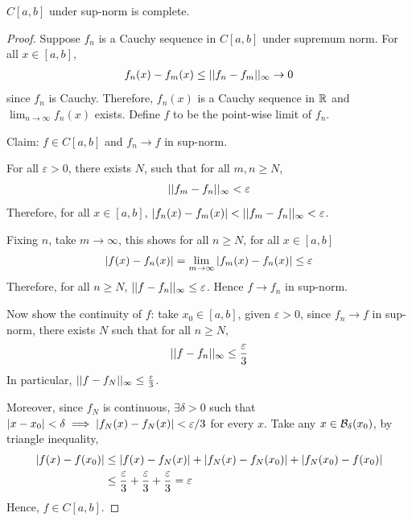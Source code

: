 \documentclass[11pt]{article}
\begin{document}
	\begin{proposition}
		$C[a, b]$ under sup-norm is complete.
		\begin{proof}
			Suppose $f_n$ is a Cauchy sequence in $C[a, b]$ under supremum norm. For all $x \in [a, b]$,
			\begin{align}
				f_n(x) - f_m(x) \leq \vert \vert {f_n - f_m} \vert \vert_\infty \to 0
			\end{align}
			since $f_n$ is Cauchy. Therefore, $f_n(x)$ is a Cauchy sequence in $\mathbb{R}$ and $\lim_{n\to\infty} f_n(x)$ exists. Define $f$ to be the point-wise limit of $f_n$.
			
			Claim: $f \in C[a, b]$ and $f_n \to f$ in sup-norm.
			
			For all $\varepsilon > 0$, there exists $N$, such that for all $m, n \geq N$,
			\begin{align}
				\vert \vert {f_m - f_n} \vert \vert_\infty < \varepsilon
			\end{align}
			Therefore, for all $x \in [a, b]$, $\left \vert {f_n(x) - f_m(x)} \right \vert < \vert \vert {f_m - f_n} \vert \vert_\infty < \varepsilon$.
			
			Fixing $n$, take $m \to \infty$, this shows for all $n \geq N$, for all $x \in [a, b]$
			\begin{align}
				\left \vert {f(x) - f_n(x)} \right \vert = \lim_{m\to\infty} \left \vert {f_m(x) - f_n(x)} \right \vert \leq \varepsilon
			\end{align}
			Therefore, for all $n \geq N$, $\vert \vert {f - f_n} \vert \vert_\infty \leq \varepsilon$. Hence $f \to f_n$ in sup-norm.
			
			Now show the continuity of $f$: take $x_0 \in [a, b]$, given $\varepsilon > 0$, since $f_n \to f$ in sup-norm, there exists $N$ such that for all $n \geq N$,
			\begin{align}
				\vert \vert {f - f_n} \vert \vert_\infty \leq \frac{\varepsilon}{3}
			\end{align}
			In particular, $\vert \vert {f - f_N} \vert \vert_\infty \leq \frac{\varepsilon}{3}$.
			
			Moreover, since $f_N$ is continuous, $\exists \delta > 0$ such that $\left \vert {x - x_0} \right \vert < \delta \implies \left \vert {f_N(x) - f_N(x)} \right \vert < \varepsilon / 3$ for every $x$. Take any $x \in \mathcal{{B}}_\delta(x_0)$, by triangle inequality,
			\begin{align}
				\left \vert {f(x) - f(x_0)} \right \vert &\leq \left \vert {f(x) - f_N(x)} \right \vert + \left \vert {f_N(x) - f_N(x_0)} \right \vert + \left \vert {f_N(x_0) - f(x_0)} \right \vert \\
				&\leq \frac{\varepsilon}{3} + \frac{\varepsilon}{3} + \frac{\varepsilon}{3} = \varepsilon
			\end{align}
			Hence, $f \in C[a, b]$. 
		\end{proof}
	\end{proposition}
\end{document}
